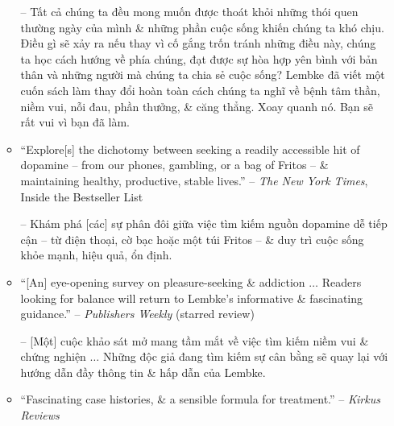 \documentclass{article}
\begin{document}
\begin{enumerate}
\begin{itemize}
		-- Tất cả chúng ta đều mong muốn được thoát khỏi những thói quen thường ngày của mình \& những phần cuộc sống khiến chúng ta khó chịu. Điều gì sẽ xảy ra nếu thay vì cố gắng trốn tránh những điều này, chúng ta học cách hướng về phía chúng, đạt được sự hòa hợp yên bình với bản thân và những người mà chúng ta chia sẻ cuộc sống? Lembke đã viết một cuốn sách làm thay đổi hoàn toàn cách chúng ta nghĩ về bệnh tâm thần, niềm vui, nỗi đau, phần thưởng, \& căng thẳng. Xoay quanh nó. Bạn sẽ rất vui vì bạn đã làm.
		\item ``Explore[s] the dichotomy between seeking a readily accessible hit of dopamine -- from our phones, gambling, or a bag of Fritos -- \& maintaining healthy, productive, stable lives.'' -- {\it The New York Times}, Inside the Bestseller List
		
		-- Khám phá [các] sự phân đôi giữa việc tìm kiếm nguồn dopamine dễ tiếp cận -- từ điện thoại, cờ bạc hoặc một túi Fritos -- \& duy trì cuộc sống khỏe mạnh, hiệu quả, ổn định.		
		\item ``[An] eye-opening survey on pleasure-seeking \& addiction $\ldots$ Readers looking for balance will return to Lembke's informative \& fascinating guidance.'' -- {\it Publishers Weekly} (starred review)
		
		-- [Một] cuộc khảo sát mở mang tầm mắt về việc tìm kiếm niềm vui \& chứng nghiện $\ldots$ Những độc giả đang tìm kiếm sự cân bằng sẽ quay lại với hướng dẫn đầy thông tin \& hấp dẫn của Lembke.
		\item ``Fascinating case histories, \& a sensible formula for treatment.'' -- {\it Kirkus Reviews}
		

\end{itemize}
\end{enumerate}
\end{document}
